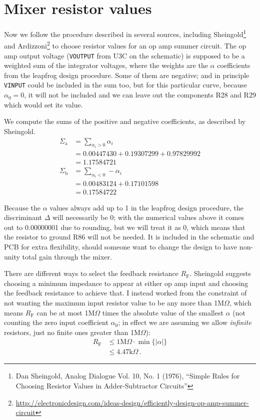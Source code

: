 \section{Mixer resistor values}

Now we follow the procedure described in several sources, including
Sheingold\footnote{Dan Sheingold, Analog Dialogue Vol.  10, No.  1 (1976),
``Simple Rules for Choosing Resistor Values in Adder-Subtractor Circuits''}
and
Ardizzoni\footnote{\url{http://electronicdesign.com/ideas-design/efficiently-design-op-amp-summer-circuit}}
to choose resistor values for an op amp summer circuit.  The op amp output
voltage (\texttt{VOUTPUT} from U3C on the schematic) is supposed to be a
weighted sum of the integrator voltages, where the weights are the $\alpha$
coefficients from the leapfrog design procedure.  Some of them are negative;
and in principle \texttt{VINPUT} could be included in the sum too, but for
this particular curve, because $\alpha_0=0$, it will not be included and we
can leave out the components R28 and R29 which would set its value.

We compute the sums of the positive and negative coefficients, as
described by Sheingold.
\begin{align*}
  \Sigma_\textrm{a} &= \sum_{\alpha_i>0} \alpha_i \\
    &= 0.00447430+0.19307299+0.97829992 \\
    &= 1.17584721 \\
  \Sigma_\textrm{b} &= \sum_{\alpha_i<0} -\alpha_i \\
    &= 0.00483124+0.17101598 \\
    &= 0.17584722
\end{align*}

Because the $\alpha$ values always add up to 1 in the leapfrog design
procedure, the discriminant $\Delta$ will necessarily be 0; with the
numerical values above it comes out to 0.00000001 due to rounding, but we
will treat it as 0, which means that the resistor to ground R86 will not be
needed.  It is included in the schematic and PCB for extra flexibility,
should someone want to change the design to have non-unity total gain
through the mixer.

There are different ways to select the feedback resistance $R_\textrm{F}$. 
Sheingold suggests choosing a minimum impedance to appear at either op amp
input and choosing the feedback resistance to achieve that.  I instead
worked from the constraint of not wanting the maximum input resistor value
to be any more than 1M$\Omega$, which means $R_\textrm{F}$ can be at most
1M$\Omega$ times the absolute value of the smallest $\alpha$ (not counting
the zero input coefficient $\alpha_0$; in effect we are assuming we allow
\emph{infinite} resistors, just no finite ones greater than 1M$\Omega$):
\begin{align*}
  R_\textrm{F} &\le 1\textrm{M}\Omega \cdot \min \{ |\alpha| \} \\
    & \le 4.47\textrm{k}\Omega \, .
\end{align*}

